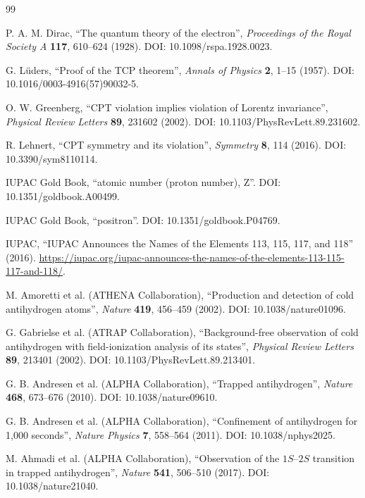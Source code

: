\documentclass[11pt,a4paper]{article}
\begin{document}
\sloppy
\begin{thebibliography}{99}

P. A. M. Dirac, \enquote{The quantum theory of the electron}, \emph{Proceedings of the Royal Society A} \textbf{117}, 610--624 (1928). DOI: 10.1098/rspa.1928.0023.

G. L\"uders, \enquote{Proof of the TCP theorem}, \emph{Annals of Physics} \textbf{2}, 1--15 (1957). DOI: 10.1016/0003-4916(57)90032-5.

O. W. Greenberg, \enquote{CPT violation implies violation of Lorentz invariance}, \emph{Physical Review Letters} \textbf{89}, 231602 (2002). DOI: 10.1103/PhysRevLett.89.231602.

R. Lehnert, \enquote{CPT symmetry and its violation}, \emph{Symmetry} \textbf{8}, 114 (2016). DOI: 10.3390/sym8110114.

IUPAC Gold Book, \enquote{atomic number (proton number), Z}. DOI: 10.1351/goldbook.A00499.

IUPAC Gold Book, \enquote{positron}. DOI: 10.1351/goldbook.P04769.

IUPAC, \enquote{IUPAC Announces the Names of the Elements 113, 115, 117, and 118} (2016). \url{https://iupac.org/iupac-announces-the-names-of-the-elements-113-115-117-and-118/}.

M. Amoretti et al. (ATHENA Collaboration), \enquote{Production and detection of cold antihydrogen atoms}, \emph{Nature} \textbf{419}, 456--459 (2002). DOI: 10.1038/nature01096.

G. Gabrielse et al. (ATRAP Collaboration), \enquote{Background-free observation of cold antihydrogen with field-ionization analysis of its states}, \emph{Physical Review Letters} \textbf{89}, 213401 (2002). DOI: 10.1103/PhysRevLett.89.213401.

G. B. Andresen et al. (ALPHA Collaboration), \enquote{Trapped antihydrogen}, \emph{Nature} \textbf{468}, 673--676 (2010). DOI: 10.1038/nature09610.

G. B. Andresen et al. (ALPHA Collaboration), \enquote{Confinement of antihydrogen for 1,000 seconds}, \emph{Nature Physics} \textbf{7}, 558--564 (2011). DOI: 10.1038/nphys2025.

M. Ahmadi et al. (ALPHA Collaboration), \enquote{Observation of the $1S$--$2S$ transition in trapped antihydrogen}, \emph{Nature} \textbf{541}, 506--510 (2017). DOI: 10.1038/nature21040.


\end{thebibliography}
\end{document}
